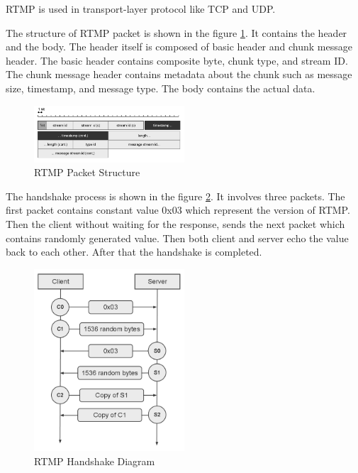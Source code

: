 \documentclass[en]{university}
\begin{document}
RTMP is used in transport-layer protocol like TCP and UDP.

The structure of RTMP packet is shown in the figure \ref{fig:RTMPPacket}. It contains the header and the body. The header itself is composed of basic header and chunk message header. The basic header contains composite byte, chunk type, and stream ID. The chunk message header contains metadata about the chunk such as message size, timestamp, and message type. The body contains the actual data.

\begin{figure}
    \centering
    \includegraphics[width=0.5\textwidth]{./resources/RTMPPacket.png}
    \caption{RTMP Packet Structure}
    \label{fig:RTMPPacket}
\end{figure}

The handshake process is shown in the figure \ref{fig:RTMPHandshake}. It involves three packets. The first packet contains constant value 0x03 which represent the version of RTMP. Then the client without waiting for the response, sends the next packet which contains randomly generated value. Then both client and server echo the value back to each other. After that the handshake is completed.

\begin{figure}
    \centering
    \includegraphics[width=0.5\textwidth]{./resources/RTMPHandshake.png}
    \caption{RTMP Handshake Diagram}
    \label{fig:RTMPHandshake}
\end{figure}
\end{document}

